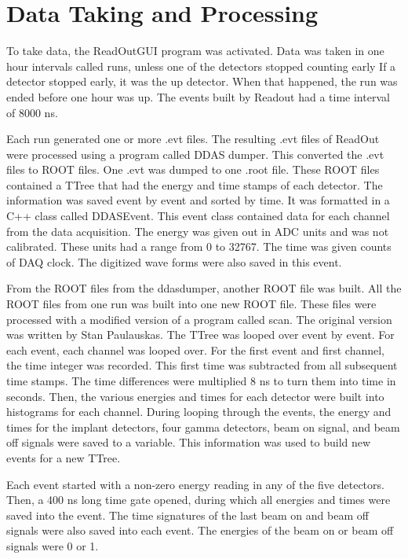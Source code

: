\documentclass[../MaxHughesThesis.tex]{subfiles}
\begin{document}
\section{Data Taking and Processing}
To take data, the ReadOutGUI program was activated. 
Data was taken in one hour intervals called runs, unless one of the detectors stopped counting early
If a detector stopped early, it was the up detector.
When that happened, the run was ended before one hour was up. 
The events built by Readout had a time interval of 8000 ns.

Each run generated one or more .evt files. 
The resulting .evt files of ReadOut were processed using a program called DDAS dumper.
This converted the .evt files to ROOT files.
One .evt was dumped to one .root file. 
These ROOT files contained a TTree that had the energy and time stamps of each detector.
The information was saved event by event and sorted by time. 
It was formatted in a C++ class called DDASEvent. 
This event class contained data for each channel from the data acquisition.
The energy was given out in ADC units and was not calibrated.
These units had a range from 0 to 32767.
The time was given counts of DAQ clock.
The digitized wave forms were also saved in this event. 

From the ROOT files from the ddasdumper, another ROOT file was built.
All the ROOT files from one run was built into one new ROOT file. 
These files were processed with a modified version of a program called scan.
The original version was written by Stan Paulauskas.
The TTree was looped over event by event.
For each event, each channel was looped over. 
For the first event and first channel, the time integer was recorded. 
This first time was subtracted from all subsequent time stamps.
The time differences were multiplied 8 ns to turn them into time in seconds. 
Then, the various energies and times for each detector were built into histograms for each channel. 
During looping through the events, the energy and times for the implant detectors, four gamma detectors, beam on signal, and beam off signals were saved to a variable.
This information was used to build new events for a new TTree.

Each event started with a non-zero energy reading in any of the five detectors.
Then, a 400 ns long time gate opened, during which all energies and times were saved into the event.
The time signatures of the last beam on and beam off signals were also saved into each event.
The energies of the beam on or beam off signals were 0 or 1.
\end{document}
